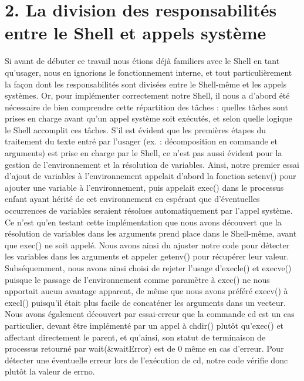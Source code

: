 \documentclass{article}
\begin{document}
\section*{ 2. La division des responsabilités entre le Shell et appels système }
Si avant de débuter ce travail nous étions déjà familiers avec le Shell en tant qu’usager, nous en ignorions le fonctionnement interne, et tout particulièrement la façon dont les responsabilités sont divisées entre le Shell-même et les appels systèmes. Or, pour implémenter correctement notre Shell, il nous a d’abord été nécessaire de bien comprendre cette répartition des tâches : quelles tâches sont prises en charge avant qu’un appel système soit exécutés, et selon quelle logique le Shell accomplit ces tâches. 
S’il est évident que les premières étapes du traitement du texte entré par l’usager (ex. : décomposition en commande et arguments) est prise en charge par le Shell, ce n’est pas aussi évident pour la gestion de l’environnement et la résolution de variables. Ainsi, notre premier essai d’ajout de variables à l’environnement appelait d’abord la fonction setenv() pour ajouter une variable à l’environnement, puis appelait exec() dans le processus enfant ayant hérité de cet environnement en espérant que d’éventuelles occurrences de variables seraient résolues automatiquement par l’appel système. Ce n’est qu’en testant cette implémentation que nous avons découvert que la résolution de variables dans les arguments prend place dans le Shell-même, avant que exec() ne soit appelé. Nous avons ainsi du ajuster notre code pour détecter les variables dans les arguments et appeler getenv() pour récupérer leur valeur. 
Subséquemment, nous avons ainsi choisi de rejeter l’usage d’execle() et execve() puisque le passage de l’environnement comme paramètre à exec() ne nous apportait aucun avantage apparent, de même que nous avons préféré execv() à execl() puisqu’il était plus facile de concaténer les arguments dans un vecteur.
Nous avons également découvert par essai-erreur que la commande cd est un cas particulier, devant être implémenté par un appel à chdir() plutôt qu’exec() et affectant directement le parent, et qu’ainsi, son statut de terminaison de processus retourné par wait(\&waitError) est de 0 même en cas d’erreur. Pour détecter une éventuelle erreur lors de l’exécution de cd, notre code vérifie donc plutôt la valeur de errno.
\end{document}
